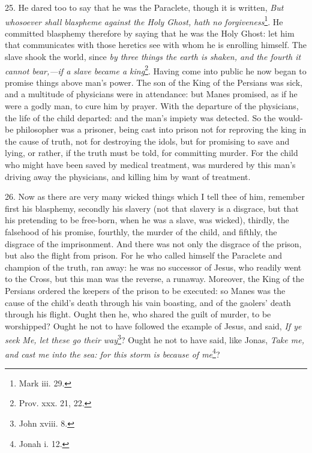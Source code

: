 25. He dared too to say that he was the Paraclete, though it is written, \emph{But whosoever shall blaspheme against the Holy Ghost, hath no forgiveness}\footnote{Mark iii. 29.}. He committed blasphemy therefore by saying that he was the Holy Ghost: let him that communicates with those heretics see with whom he is enrolling himself. The slave shook the world, since \emph{by three things the earth is shaken, and the fourth it cannot bear,—if a slave became a king}\footnote{Prov. xxx. 21, 22.}. Having come into public he now began to promise things above man’s power. The son of the King of the Persians was sick, and a multitude of physicians were in attendance: but Manes promised, as if he were a godly man, to cure him by prayer. With the departure of the physicians, the life of the child departed: and the man’s impiety was detected. So the would-be philosopher was a prisoner, being cast into prison not for reproving the king in the cause of truth, not for destroying the idols, but for promising to save and lying, or rather, if the truth must be told, for committing murder. For the child who might have been saved by medical treatment, was murdered by this man’s driving away the physicians, and killing him by want of treatment.

26. Now as there are very many wicked things which I tell thee of him, remember first his blasphemy, secondly his slavery (not that slavery is a disgrace, but that his pretending to be free-born, when he was a slave, was wicked), thirdly, the falsehood of his promise, fourthly, the murder of the child, and fifthly, the disgrace of the imprisonment. And there was not only the disgrace of the prison, but also the flight from prison. For he who called himself the Paraclete and champion of the truth, ran away: he was no successor of Jesus, who readily went to the Cross, but this man was the reverse, a runaway. Moreover, the King of the Persians ordered the keepers of the prison to be executed: so Manes was the cause of the child’s death through his vain boasting, and of the gaolers’ death through his flight. Ought then he, who shared the guilt of murder, to be worshipped? Ought he not to have followed the example of Jesus, and said, \emph{If ye seek Me, let these go their way}\footnote{John xviii. 8.}? Ought he not to have said, like Jonas, \emph{Take me, and cast me into the sea: for this storm is because of me}\footnote{Jonah i. 12.}?

